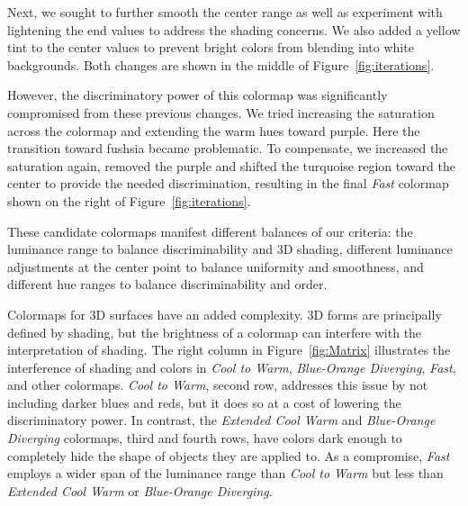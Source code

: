 \documentclass{IEEEcsmag}
\newcommand*{\colormap}[1]{\textsl{#1}\xspace}
\newcommand*{\coolwarm}{\colormap{Cool to Warm}}
\newcommand*{\blueorange}{\colormap{Blue-Orange Diverging}}
\newcommand*{\fast}{\colormap{Fast}}
\newcommand*{\extendedcoolwarm}{\colormap{Extended Cool Warm}}
\begin{document}
Next, we sought to further smooth the center range as well as experiment with lightening the end values to address the shading concerns.
We also added a yellow tint to the center values to prevent bright colors from blending into white backgrounds.
Both changes are shown in the middle of Figure~\ref{fig:iterations}.


However, the discriminatory power of this colormap was significantly compromised from these previous changes. We tried increasing the saturation across the colormap and extending the warm hues toward purple. Here the transition toward fushsia became problematic. To compensate, we increased the saturation again, removed the purple and shifted the turquoise region toward the center to provide the needed discrimination, resulting in the final \fast colormap shown on the right of Figure~\ref{fig:iterations}.

These candidate colormaps manifest different balances of our criteria: the luminance range to balance discriminability and 3D shading, different luminance adjustments at the center point to balance uniformity and smoothness, and different hue ranges to balance discriminability and order.



Colormaps for 3D surfaces have an added complexity.
3D forms are principally defined by shading, but the brightness of a colormap can interfere with the interpretation of shading.
The right column in Figure~\ref{fig:Matrix} illustrates the interference of shading and colors in \coolwarm, \blueorange, \fast, and other colormaps.
\coolwarm, second row, addresses this issue by not including darker blues and reds, but it does so at a cost of lowering the discriminatory power.
In contrast, the \extendedcoolwarm and \blueorange colormaps, third and fourth rows, have colors dark enough to completely hide the shape of objects they are applied to.
As a compromise, \fast employs a wider span of the luminance range than \coolwarm but less than \extendedcoolwarm or \blueorange.
\end{document}
